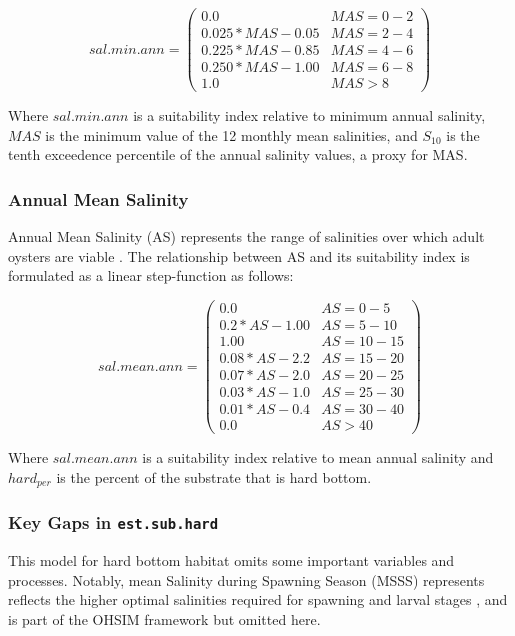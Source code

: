 \documentclass[
]{book}
\begin{document}
\[sal.min.ann = \begin{pmatrix} 0.0 & MAS=0-2\\
0.025*MAS-0.05 & MAS=2-4\\
0.225*MAS-0.85 & MAS=4-6\\
0.250*MAS-1.00 & MAS=6-8\\
1.0 & MAS>8
\end{pmatrix}\]

Where \(sal.min.ann\) is a suitability index relative to minimum annual salinity, \(MAS\) is the minimum value of the 12 monthly mean salinities, and \(S_{10}\) is the tenth exceedence percentile of the annual salinity values, a proxy for MAS.

\hypertarget{annual-mean-salinity}{%
\subsubsection{Annual Mean Salinity}\label{annual-mean-salinity}}

Annual Mean Salinity (AS) represents the range of salinities over which adult oysters are viable \citep[@][]{cake_habitat_1983}. The relationship between AS and its suitability index is formulated as a linear step-function as follows:

\[sal.mean.ann = \begin{pmatrix} 0.0 & AS=0-5\\
0.2*AS-1.00 & AS=5-10\\
1.00 & AS=10-15\\
0.08*AS-2.2 & AS=15-20\\
0.07*AS-2.0 & AS=20-25\\
0.03*AS-1.0 & AS=25-30\\
0.01*AS-0.4 & AS=30-40\\
0.0 & AS>40
\end{pmatrix}\]

Where \(sal.mean.ann\) is a suitability index relative to mean annual salinity and \(hard_{per}\) is the percent of the substrate that is hard bottom.

\hypertarget{key-gaps-in-est.sub.hard}{%
\subsubsection{\texorpdfstring{Key Gaps in \texttt{est.sub.hard}}{Key Gaps in est.sub.hard}}\label{key-gaps-in-est.sub.hard}}

This model for hard bottom habitat omits some important variables and processes. Notably, mean Salinity during Spawning Season (MSSS) represents reflects the higher optimal salinities required for spawning and larval stages \citep{butler_summary_1954},\citep[@][]{cake_habitat_1983} and is part of the OHSIM framework but omitted here.
\end{document}
